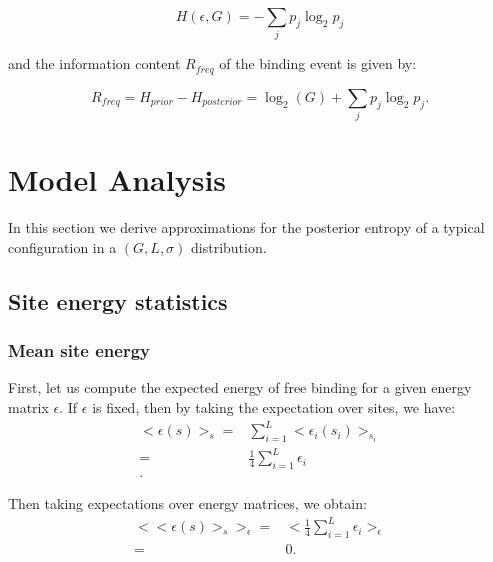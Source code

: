 \documentclass{article}
\begin{document}
\begin{equation}
\label{eq:post_ent}
H(\epsilon,G) = -\sum_jp_j\log_2p_j
\end{equation}

and the information content $R_{freq}$ of the binding event is given by:

\begin{equation}
  \label{eq:rfreq}
  R_{freq} = H_{prior} - H_{posterior} = \log_2(G) + \sum_jp_j\log_2p_j.
\end{equation}

\section{Model Analysis}
In this section we derive approximations for the posterior entropy of
a typical configuration in a $(G,L,\sigma)$ distribution.

\subsection{Site energy statistics}
\subsubsection{Mean site energy}
First, let us compute the expected energy of free binding for a given
energy matrix $\epsilon$.  If $\epsilon$ is fixed, then by taking the
expectation over sites, we have:
\begin{align*}
  <\epsilon(s)>_s =& \sum_{i=1}^L<\epsilon_i(s_i)>_{s_i}\\
  =& \frac{1}{4}\sum_{i=1}^L\epsilon_i\\.
\end{align*}

Then taking expectations over energy matrices, we obtain:
\begin{align*}
  <<\epsilon(s)>_s>_\epsilon =& <\frac{1}{4}\sum_{i=1}^L\epsilon_i>_\epsilon\\
  =& 0.
\end{align*}
\end{document}
